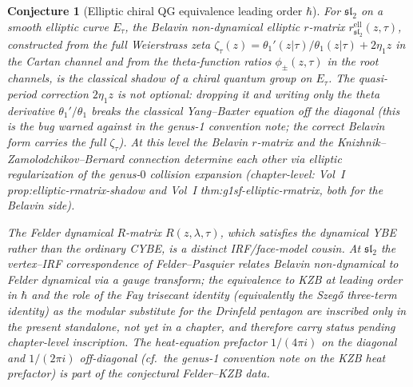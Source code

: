 \documentclass[11pt]{article}
\theoremstyle{plain}
\newtheorem{conjecture}[theorem]{Conjecture}
\theoremstyle{definition}
\theoremstyle{remark}
\newcommand{\fsl}{\mathfrak{sl}}
\begin{document}
\begin{conjecture}[Elliptic chiral QG equivalence
leading order $\hbar$]\label{conj:chiral-qg-equiv-elliptic-sf}
\ClaimStatusConjectured
For $\fsl_2$ on a smooth elliptic curve $E_\tau$, the Belavin
non-dynamical elliptic $r$-matrix $r^{\mathrm{ell}}_{\fsl_2}(z,\tau)$,
constructed from the full Weierstrass zeta
$\zeta_\tau(z) = \theta_1'(z|\tau)/\theta_1(z|\tau) + 2\eta_1 z$ in
the Cartan channel and from the theta-function ratios
$\phi_\pm(z,\tau)$ in the root channels, is the classical shadow of a
chiral quantum group on $E_\tau$. The quasi-period correction
$2\eta_1 z$ is not optional: dropping it and writing only the theta
derivative $\theta_1'/\theta_1$ breaks the classical Yang--Baxter
equation off the diagonal (this is the bug warned against in the
genus-1 convention note; the correct Belavin form carries the full
$\zeta_\tau$). At this level the Belavin $r$-matrix and the
Knizhnik--Zamolodchikov--Bernard connection determine each other via
elliptic regularization of the genus-$0$ collision expansion
(chapter-level: Vol~I
\textup{\textsf{prop:elliptic-rmatrix-shadow}} and Vol~I
\textup{\textsf{thm:g1sf-elliptic-rmatrix}}, both
\ClaimStatusProvedHere for the Belavin side).

The Felder \emph{dynamical} $R$-matrix $R(z,\lambda,\tau)$, which
satisfies the dynamical YBE rather than the ordinary CYBE, is a
distinct IRF/face-model cousin. At $\fsl_2$ the vertex--IRF
correspondence of Felder--Pasquier relates Belavin non-dynamical to
Felder dynamical via a gauge transform; the equivalence to KZB at
leading order in $\hbar$ and the role of the Fay trisecant identity
(equivalently the Szegő three-term identity) as the modular
substitute for the Drinfeld pentagon are inscribed only in the
present standalone, not yet in a chapter, and therefore carry
\ClaimStatusConjectured status pending chapter-level inscription. The
heat-equation prefactor $1/(4\pi i)$ on the diagonal and
$1/(2\pi i)$ off-diagonal (cf.\ the genus-1 convention note on the
KZB heat prefactor) is part of the conjectural Felder--KZB data.
\end{conjecture}
\end{document}
